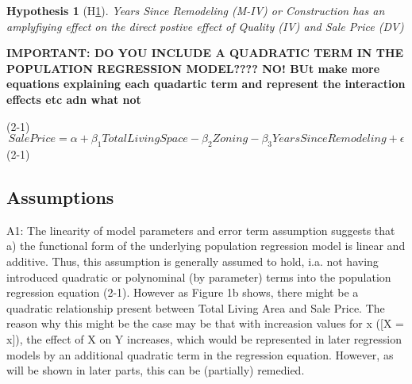 \documentclass[a4paper]{article}
\newtheorem{hyp}{Hypothesis}
\begin{document}
\begin{hyp}[H\ref{hyp:third}] \label{hyp:third}
Years Since Remodeling (M-IV) or Construction has an amplyfiying effect on the direct postive effect of Quality (IV) and Sale Price (DV)
\end{hyp}

\begin{center}
\end{center}




\textbf{IMPORTANT: DO YOU INCLUDE A QUADRATIC TERM IN THE POPULATION REGRESSION MODEL???? NO! BUt make more equations explaining each quadartic term and represent the interaction effects etc adn what not }

(2-1)$$ {SalePrice} = \alpha + \beta_{1} TotalLivingSpace - \beta_{2}  Zoning - \beta_{3}  YearsSinceRemodeling +\epsilon$$ (2-1)



\subsection{Assumptions}


\indent A1: The linearity of model parameters and error term assumption suggests that a) the functional form of the underlying population regression model is linear and additive. Thus, this assumption is generally assumed to hold, i.a. not having introduced quadratic or polynominal (by parameter) terms into the population regression equation (2-1). However as Figure 1b shows, there might be a quadratic relationship present between Total Living Area and Sale Price. The reason why this might be the case may be that with increasion values for x ([X = x]), the effect of X on Y increases, which would be represented in later regression models by an additional quadratic term in the regression equation. However, as will be shown in later parts, this can be (partially) remedied.
\end{document}
